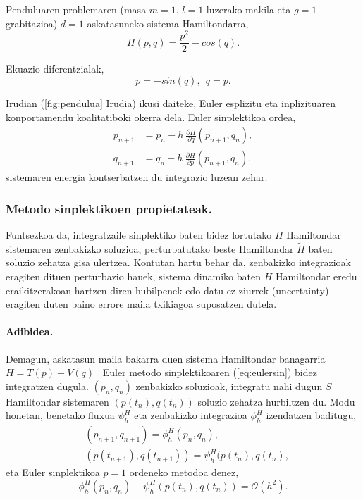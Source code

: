 Penduluaren problemaren (masa $m=1$, $l=1$ luzerako makila eta $g=1$ grabitazioa) $d=1$ askatasuneko sistema Hamiltondarra,
\begin{equation*}
H(p,q)= \frac{p^2}{2}- cos (q).
\end{equation*}

Ekuazio diferentzialak,
\begin{equation}
\label{eq:pendulua}
\dot{p}= -sin (q), \ \ \dot{q}=p.
\end{equation}

Irudian (\ref{fig:pendulua} Irudia) ikusi daiteke, Euler esplizitu eta inplizituaren konportamendu koalitatiboki okerra dela. Euler sinplektikoa ordea, 
\begin{align}
\label{eq:eulersin}
p_{n+1} & =p_n-h \ \frac{\partial H }{\partial q} (p_{n+1},q_{n}), \\
q_{n+1} & =q_n+h \ \frac{\partial H}{\partial p} (p_{n+1},q_{n}).
\end{align}
sistemaren energia kontserbatzen du integrazio luzean zehar.


\subsubsection*{Metodo sinplektikoen propietateak.}

Funtsezkoa da, integratzaile sinplektiko baten bidez lortutako $H$ Hamiltondar sistemaren zenbakizko soluzioa, perturbatutako beste Hamiltondar $\widetilde{H}$ baten soluzio zehatza gisa ulertzea. Kontutan hartu behar da, zenbakizko integrazioak eragiten dituen perturbazio hauek, sistema dinamiko baten $H$ Hamiltondar eredu eraikitzerakoan hartzen  diren hubilpenek edo datu ez ziurrek (uncertainty) eragiten duten baino errore maila txikiagoa suposatzen dutela.    
 

\paragraph{Adibidea.}
Demagun, askatasun maila bakarra duen sistema Hamiltondar banagarria $H=T(p)+V(q)$ ~Euler metodo sinplektikoaren (\ref{eq:eulersin}) bidez integratzen dugula.  $(p_n,q_n)$ zenbakizko soluzioak, integratu nahi dugun $S$ Hamiltondar sistemaren $(p(t_n),q(t_n))$ soluzio zehatza hurbiltzen du.  Modu honetan, benetako fluxua $\psi_h^H$ eta zenbakizko integrazioa $\phi_h^H$ izendatzen baditugu,
\begin{align*}
&(p_{n+1},q_{n+1}) =\phi_h^H(p_n,q_n), \\
&(p(t_{n+1}),q(t_{n+1})) =\psi_h^H(p(t_n),q(t_n), 
\end{align*} 
eta Euler sinplektikoa $p=1$ ordeneko metodoa denez,
\begin{equation*}
\phi_h^H(p_n,q_n)-\psi_h^H(p(t_n),q(t_n))= \mathcal{O}(h^2).
\end{equation*}    

